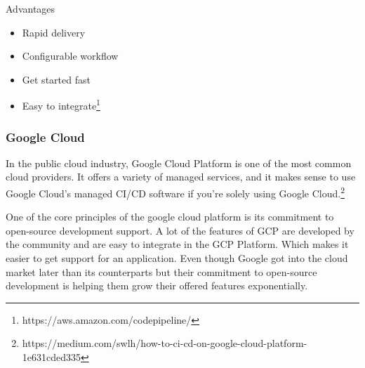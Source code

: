 Advantages
   \begin{itemize}
     \item Rapid delivery
     \item Configurable workflow
     \item Get started fast
     \item Easy to integrate\footnote{https://aws.amazon.com/codepipeline/}   
   \end{itemize}
   
   

%
\subsubsection{Google Cloud}
%
In the public cloud industry, Google Cloud Platform is one of the most common cloud providers. It offers a variety of managed services, and it makes sense to use Google Cloud's managed CI/CD software if you're solely using Google Cloud.\footnote{https://medium.com/swlh/how-to-ci-cd-on-google-cloud-platform-1e631cded335}

One of the core principles of the google cloud platform is its commitment to open-source development support. A lot of the features of GCP are developed by the community and are easy to integrate in the GCP Platform. Which makes it easier to get support for an application. Even though Google got into the cloud market later than its counterparts but their commitment to open-source development is helping them grow their offered features exponentially.  
%